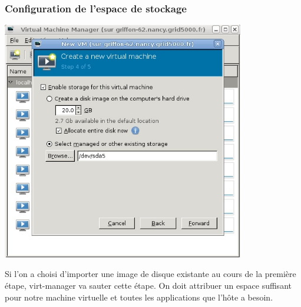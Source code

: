 \subsubsection{Configuration de l'espace de stockage}
\begin{center}
\includegraphics[width=300pt]{images/Storage.jpg}
\end{center}

 Si l'on a choisi d'importer une image de disque existante au cours de la première étape, virt-manager va sauter cette étape.
On doit attribuer un espace suffisant pour notre machine virtuelle et toutes les applications que l'hôte a besoin.


